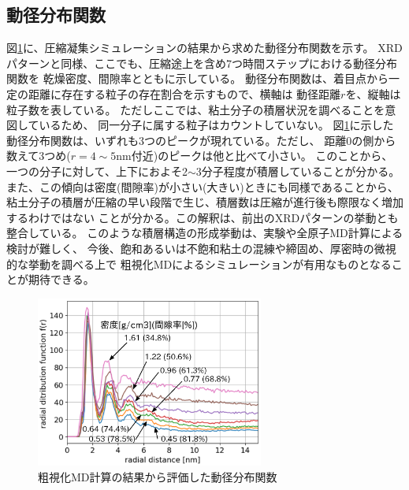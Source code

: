 ﻿\documentclass[11pt,a4j]{jarticle}
\begin{document}
\subsection{動径分布関数}
図\ref{fig:fig4}に、圧縮凝集シミュレーションの結果から求めた動径分布関数を示す。
XRDパターンと同様、ここでも、圧縮途上を含め7つ時間ステップにおける動径分布関数を
乾燥密度、間隙率とともに示している。
動径分布関数は、着目点から一定の距離に存在する粒子の存在割合を示すもので、横軸は
動径距離$r$を、縦軸は粒子数を表している。
ただしここでは、粘土分子の積層状況を調べることを意図しているため、
同一分子に属する粒子はカウントしていない。
図\ref{fig:fig4}に示した動径分布関数は、いずれも3つのピークが現れている。ただし、
距離0の側から数えて3つめ($r=4\sim 5$nm付近)のピークは他と比べて小さい。
このことから、一つの分子に対して、上下におよそ2$\sim$3分子程度が積層していることが分かる。
また、この傾向は密度(間隙率)が小さい(大きい)ときにも同様であることから、
粘土分子の積層が圧縮の早い段階で生じ、積層数は圧縮が進行後も際限なく増加するわけではない
ことが分かる。この解釈は、前出のXRDパターンの挙動とも整合している。
このような積層構造の形成挙動は、実験や全原子MD計算による検討が難しく、
今後、飽和あるいは不飽和粘土の混練や締固め、厚密時の微視的な挙動を調べる上で
粗視化MDによるシミュレーションが有用なものとなることが期待できる。
\begin{figure}
	\centering
	\includegraphics[keepaspectratio,width=75mm]{Figs/rdfs.eps}
	\caption{粗視化MD計算の結果から評価した動径分布関数}
	\label{fig:fig4}
\end{figure}
\end{document}
